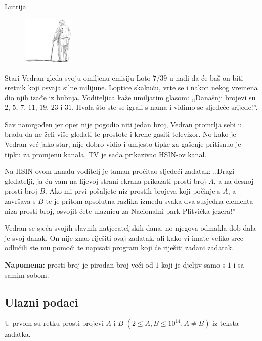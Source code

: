 \begin{statement}[
  problempoints=70,
  timelimit=1 sekunda,
  memorylimit=512 MiB,
]{Lutrija}

\setlength\intextsep{-0.1cm}
\begin{figure}
\centering
\includegraphics[width=0.22\textwidth]{img/vedran_kurdija.png}
\end{figure}

Stari Vedran gleda svoju omiljenu emisiju Loto $7/39$ u nadi da će baš on biti
sretnik koji osvaja silne milijune. Loptice skakuću, vrte se i nakon nekog
vremena dio njih izađe iz bubnja. Voditeljica kaže umiljatim glasom: ,,Današnji
brojevi su $2$, $5$, $7$, $11$, $19$, $23$ i $31$. Hvala što ste se igrali s
nama i vidimo se sljedeće srijede!''.

Sav namrgođen jer opet nije pogodio niti jedan broj, Vedran promrlja sebi u
bradu da ne želi više gledati te prostote i krene gasiti televizor. No kako je
Vedran već jako star, nije dobro vidio i umjesto tipke za gašenje pritisnuo je
tipku za promjenu kanala. TV je sada prikazivao HSIN-ov kanal.

Na HSIN-ovom kanalu voditelj je taman pročitao sljedeći zadatak: ,,Dragi
gledatelji, ja ću vam na lijevoj strani ekrana prikazati prosti broj $A$, a na
desnoj prosti broj $B$. Ako mi prvi pošaljete niz prostih brojeva koji počinje
s $A$, a završava s $B$ te je pritom apsolutna razlika između svaka dva susjedna
elementa niza prosti broj, osvojit ćete ulaznicu za Nacionalni park Plitvička
jezera!''

Vedran se sjeća svojih slavnih natjecateljskih dana, no njegova odmakla dob
dala je svoj danak. On nije znao riješiti ovaj zadatak, ali kako vi imate veliko
srce odlučili ste mu pomoći te napisati program koji će riješiti zadani zadatak.

\textbf{Napomena:} prosti broj je pirodan broj veći od $1$ koji je djeljiv samo
s $1$ i sa samim sobom.


\subsection*{Ulazni podaci}
U prvom su retku prosti brojevi $A$ i $B$ $(2 \le A, B \le 10^{14}, A \ne B)$ iz teksta
zadatka.


\end{statement}
